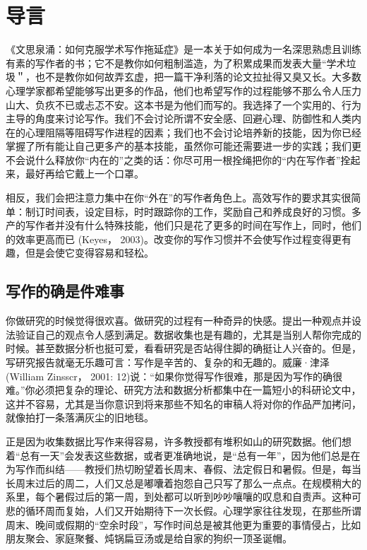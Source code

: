 \chapter{导言}
《文思泉涌：如何克服学术写作拖延症》是一本关于如何成为一名深思熟虑且训练有素的写作者的书；它不是教你如何粗制滥造，为了积累成果而发表大量“学术垃圾＂，也不是教你如何故弄玄虚，把一篇干净利落的论文拉扯得又臭又长。大多数心理学家都希望能够写出更多的作品，他们也希望写作的过程能够不那么令人压力山大、负疚不已或忐忑不安。这本书是为他们而写的。我选择了一个实用的、行为主导的角度来讨论写作。我们不会讨论所谓不安全感、回避心理、防御性和人类内在的心理阻隔等阻碍写作进程的因素；我们也不会讨论培养新的技能，因为你已经掌握了所有能让自己更多产的基本技能，虽然你可能还需要进一步的实践；我们更不会说什么释放你“内在的”之类的话：你尽可用一根拴绳把你的“内在写作者”拴起来，最好再给它戴上一个口罩。

相反，我们会把注意力集中在你“外在”的写作者角色上。高效写作的要求其实很简单：制订时间表，设定目标，时时跟踪你的工作，奖励自己和养成良好的习惯。多产的写作者并没有什么特殊技能，他们只是花了更多的时间在写作上，同时，他们的效率更高而已 (Keyes， 2003)。改变你的写作习惯并不会使写作过程变得更有趣，但是会使它变得容易和轻松。

\section{写作的确是件难事}
你做研究的时候觉得很欢喜。做研究的过程有一种奇异的快感。提出一种观点并设法验证自己的观点令人感到满足。数据收集也是有趣的，尤其是当别人帮你完成的时候。甚至数据分析也挺可爱，看看研究是否站得住脚的确挺让人兴奋的。但是，写研究报告就毫无乐趣可言：写作是辛苦的、复杂的和无趣的。威廉·津泽(William Zinsscr， 2001: 12)说：“如果你觉得写作很难，那是因为写作的确很难。”你必须把复杂的理论、研究方法和数据分析都集中在一篇短小的科研论文中，这并不容易，尤其是当你意识到将来那些不知名的审稿人将对你的作品严加拷问，就像拍打一条落满灰尘的旧地毯。

正是因为收集数据比写作来得容易，许多教授都有堆积如山的研究数据。他们想着“总有一天”会发表这些数据，或者更准确地说，是“总有一年”，因为他们总是在为写作而纠结——教授们热切盼望着长周末、春假、法定假日和暑假。但是，每当长周末过后的周二，人们又总是嘟囔着抱怨自己只写了那么一点点。在规模稍大的系里，每个暑假过后的第一周，到处都可以听到吵吵嚷嚷的叹息和自责声。这种可悲的循环周而复始，人们又开始期待下一次长假。心理学家往往发现，在那些所谓周末、晚间或假期的“空余时段”，写作时间总是被其他更为重要的事情侵占，比如朋友聚会、家庭聚餐、炖锅扁豆汤或是给自家的狗织一顶圣诞帽。


